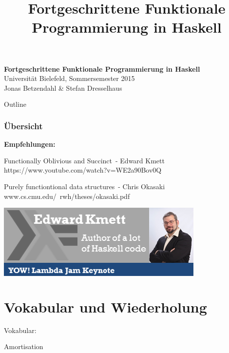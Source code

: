 \documentclass{beamer}
\title{Fortgeschrittene Funktionale Programmierung in Haskell}
\begin{document}
  

  \begin{frame}
  \begin{center}
    \huge\textbf{Fortgeschrittene Funktionale Programmierung in Haskell}\\ \bigskip
    \LARGE Universität Bielefeld, Sommersemester 2015\\ \bigskip
    \large Jonas Betzendahl \& Stefan Dresselhaus
    \end{center}
  \end{frame}


\begin{frame}[allowframebreaks]{Outline}
\frametitle{Übersicht}
\tableofcontents
\end{frame}


\begin{frame}

\textbf{Empfehlungen:}
\bigskip

\glqq Functionally Oblivious and Succinct\grqq\ - Edward Kmett\\
https://www.youtube.com/watch?v=WE2a90Bov0Q
\bigskip

\glqq Purely functiontional data structures\grqq\ - Chris Okasaki\\
www.cs.cmu.edu/~rwh/theses/okasaki.pdf
\bigskip

\begin{center}
\includegraphics[scale=0.75]{../Woche8/kmett.png} 
\end{center}

\end{frame}

\section{Vokabular und Wiederholung}
\begin{frame}
\Large
\begin{center}
Vokabular:\pause

Amortisation
\end{center}
\normalsize
\end{frame}
\end{document}
